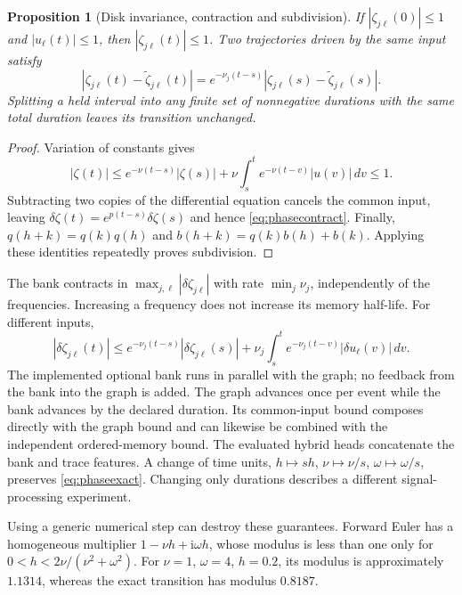 \documentclass[11pt,a4paper]{article}
\newtheorem{proposition}[theorem]{Proposition}
\theoremstyle{definition}\newtheorem{definition}[theorem]{Definition}
\begin{document}
\begin{proposition}[Disk invariance, contraction and subdivision]\label{prop:phase}
If $|\zeta_{j\ell}(0)|\leq1$ and $|u_\ell(t)|\leq1$, then $|\zeta_{j\ell}(t)|\leq1$. Two trajectories driven by the same input satisfy
\begin{equation}
 |\zeta_{j\ell}(t)-\widetilde\zeta_{j\ell}(t)|
 =e^{-\nu_j(t-s)}|\zeta_{j\ell}(s)-\widetilde\zeta_{j\ell}(s)|.\label{eq:phasecontract}
\end{equation}
Splitting a held interval into any finite set of nonnegative durations with the same total duration leaves its transition unchanged.
\end{proposition}
\begin{proof}
Variation of constants gives
\[
 |\zeta(t)|\leq e^{-\nu(t-s)}|\zeta(s)|+
 \nu\int_s^t e^{-\nu(t-v)}|u(v)|\,dv\leq1.
\]
Subtracting two copies of the differential equation cancels the common input, leaving $\delta\zeta(t)=e^{p(t-s)}\delta\zeta(s)$ and hence \eqref{eq:phasecontract}. Finally, $q(h+k)=q(k)q(h)$ and $b(h+k)=q(k)b(h)+b(k)$. Applying these identities repeatedly proves subdivision.
\end{proof}

The bank contracts in $\max_{j,\ell}|\delta\zeta_{j\ell}|$ with rate $\min_j\nu_j$, independently of the frequencies. Increasing a frequency does not increase its memory half-life. For different inputs,
\begin{equation}
 |\delta\zeta_{j\ell}(t)|\leq e^{-\nu_j(t-s)}|\delta\zeta_{j\ell}(s)|
 +\nu_j\int_s^t e^{-\nu_j(t-v)}|\delta u_\ell(v)|\,dv.\label{eq:phaseiss}
\end{equation}
The implemented optional bank runs in parallel with the graph; no feedback from the bank into the graph is added. The graph advances once per event while the bank advances by the declared duration. Its common-input bound composes directly with the graph bound and can likewise be combined with the independent ordered-memory bound. The evaluated hybrid heads concatenate the bank and trace features. A change of time units, $h\mapsto sh$, $\nu\mapsto\nu/s$, $\omega\mapsto\omega/s$, preserves \eqref{eq:phaseexact}. Changing only durations describes a different signal-processing experiment.

Using a generic numerical step can destroy these guarantees. Forward Euler has a homogeneous multiplier $1-\nu h+\mathrm i\omega h$, whose modulus is less than one only for $0<h<2\nu/(\nu^2+\omega^2)$. For $\nu=1$, $\omega=4$, $h=0.2$, its modulus is approximately $1.1314$, whereas the exact transition has modulus $0.8187$.
\end{document}
